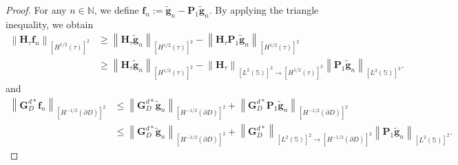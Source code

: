 \documentclass[11pt,reqno,twoside]{amsart}
\theoremstyle{definition}
\theoremstyle{remark}
\numberwithin{equation}{section}
\begin{document}
\begin{proof}
For any $n \in \mathbb{N}$, we define $\mathbf{f}_n := \tilde{\mathbf{g}}_n - \mathbf{P}_1 \tilde{\mathbf{g}}_n$. By applying the triangle inequality, we obtain
\begin{equation}\begin{aligned}\label{eq:HInequality}
	    \left\| \mathbf H_{\tau} \mathbf f_n \right\|_{\left[H^{1/2}\left(\tau \right) \right]^2 }
		&\geq \left\| \mathbf H_{\tau} \tilde{\mathbf g}_n \right\|_{\left[H^{1/2}\left(\tau \right) \right]^2 } - \left\| \mathbf H_{\tau} \mathbf P_1 \tilde{\mathbf g}_n \right\|_{\left[H^{1/2}\left(\tau \right) \right]^2 }\\
		&\geq \left\| \mathbf H_{\tau} \tilde{\mathbf g}_n \right\|_{\left[H^{1/2}\left(\tau \right) \right]^2 } - \left\| \mathbf H_{\tau} \right\|_{ \left[L^{2}\left(\mathbb S \right) \right]^2 \to \left[H^{1/2} \left(\tau \right) \right] ^2 } \left\|\mathbf P_1 \tilde{\mathbf g}_n \right\|_{\left[L^{2} \left(\mathbb S \right) \right] ^2}.
\end{aligned}\end{equation}
and
\begin{equation}\begin{aligned}\label{eq:GInequality}
		\left\| \mathbf G_D^{d*} \mathbf f_n \right\|_{\left[H^{-1/2}\left(\partial D \right) \right]^2 }
		&\leq \left\| \mathbf G_D^{d*} \tilde{\mathbf g }_n\right\|_{\left[H^{-1/2}\left(\partial D \right) \right]^2 }+ \left\| \mathbf G_D^{d*} \mathbf P_1 \tilde{\mathbf g }_n\right\|_{\left[H^{-1/2}\left(\partial D \right) \right]^2 } \\
		&\leq \left\| \mathbf G_D^{d*} \tilde{\mathbf g }_n\right\|_{\left[H^{-1/2}\left(\partial D \right) \right]^2 }+ \left\| \mathbf G_D^{d*}\right\|_{\left[L^{2} \left(\mathbb S \right) \right] ^2 \to \left[H^{-1/2}\left(\partial D \right) \right]^2} \left\|\mathbf P_1 \tilde{\mathbf g }_n\right\|_{\left[L^{2} \left(\mathbb S \right) \right] ^2}.
\end{aligned}\end{equation}


\end{proof}
\end{document}
